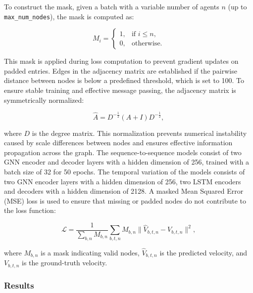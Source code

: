 To construct the mask, given a batch with a variable number of agents \( n \) (up to \texttt{max\_num\_nodes}), the mask is computed as:

\[
M_i =
\begin{cases}
1, & \text{if } i \leq n, \\
0, & \text{otherwise}.
\end{cases}
\]

This mask is applied during loss computation to prevent gradient updates on padded entries. Edges in the adjacency matrix are established if the pairwise distance between nodes is below a predefined threshold, which is set to 100. To ensure stable training and effective message passing, the adjacency matrix is symmetrically normalized:

\[
\hat{A} = D^{-\frac{1}{2}} (A + I) D^{-\frac{1}{2}},
\]

where \( D \) is the degree matrix. This normalization prevents numerical instability caused by scale differences between nodes and ensures effective information propagation across the graph. The sequence-to-sequence models consist of two GNN encoder and decoder layers with a hidden dimension of 256, trained with a batch size of 32 for 50 epochs. The temporal variation of the models consists of two GNN encoder layers with a hidden dimension of 256, two LSTM encoders and decoders  with a hidden dimension of 2128. A masked Mean Squared Error (MSE) loss is used to ensure that missing or padded nodes do not contribute to the loss function:

\[
\mathcal{L} = \frac{1}{\sum_{b,n} M_{b,n}} \sum_{b,t,n} M_{b,n} \| \hat{V}_{b,t,n} - V_{b,t,n} \|^2,
\]

where \( M_{b,n} \) is a mask indicating valid nodes, \( \hat{V}_{b,t,n} \) is the predicted velocity, and \( V_{b,t,n} \) is the ground-truth velocity.



\subsubsection{Results}

